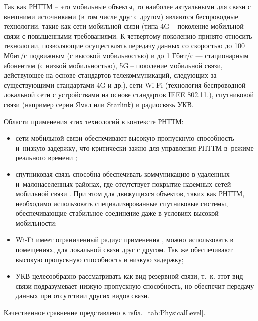 Так как РНТТМ -- это мобильные объекты, то наиболее актуальными для связи с внешними источниками (в том числе друг с другом) являются беспроводные технологии, такие как сети мобильной связи (типа
4G -- поколение мобильной связи с повышенными требованиями. К четвертому поколению принято относить технологии, позволяющие осуществлять передачу данных со скоростью до 100 Мбит/с подвижным (с высокой мобильностью) и до 1 Гбит/с — стационарным абонентам (с низкой мобильностью), 5G -- поколение мобильной связи, действующее на основе стандартов телекоммуникаций, следующих за существующими стандартами 4G и др.), сети Wi-Fi (технология беспроводной локальной сети с устройствами на основе стандартов IEEE 802.11.), спутниковой связи (например серии Ямал или Starlink) и радиосвязь УКВ.


Области применения этих технологий в контексте РНТТМ:
\begin{itemize}[beginpenalty=10000, midpenalty=10000, wide=\parindent, leftmargin=0pt]
	\item сети мобильной связи обеспечивают высокую пропускную способность и~низкую задержку, что критически важно для управления РНТТМ в~режиме реального времени \cite{6G};
	\item спутниковая связь способна обеспечивать коммуникацию в удаленных и~малонаселенных районах, где отсутствует покрытие наземных сетей мобильной связи \cite{SystemComm}. При этом для движущихся объектов, таких как РНТТМ, необходимо использовать специализированные спутниковые системы, обеспечивающие стабильное соединение даже в условиях высокой мобильности;
	\item Wi-Fi имеет ограниченный радиус применения \cite{Olifers}, можно использовать в помещениях, для локальной связи друг с другом. Так же обеспечивают высокую пропускную способность и низкую задержку;
	\item УКВ целесообразно рассматривать как вид резервной связи, т.\ к. этот вид связи подразумевает низкую пропускную способность, но обеспечит передачу данных при отсутствии других видов связи.
\end{itemize}

Качественное сравнение представлено в табл.\ \ref{tab:PhysicalLevel}.

